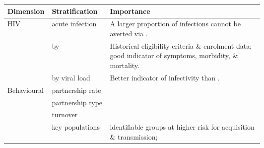 \begin{tabular}{llp{0.6\linewidth}}
	\toprule
	Dimension   & Stratification   & Importance                                                                                                        \\
	\midrule
	HIV         & acute infection  & A larger proportion of infections cannot be averted via \art.                                                     \\
	            & by \cdf          & Historical \art eligibility criteria \& enrolment data; good indicator of \hiv symptoms, morbidity, \& mortality. \\
	            & by viral load    & Better indicator of infectivity than \cdf.                                                                        \\
	\midrule
	Behavioural & partnership rate &                                                                                                                   \\
	            & partnership type &                                                                                                                   \\
	            & turnover         &                                                                                                                   \\
	            & key populations  & identifiable groups at higher risk for acquisition \& transmission;                                               \\
	\bottomrule
\end{tabular}